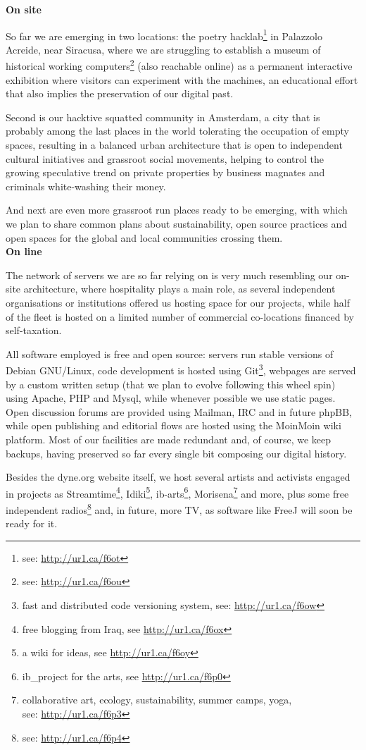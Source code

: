 \textbf{On site}

So far we are emerging in two locations: the poetry hacklab\footnote{see:
\url{http://ur1.ca/f6ot}} in Palazzolo Acreide, near Siracusa, where we are
struggling to establish a museum of historical working computers\footnote{see:
\url{http://ur1.ca/f6ou}} (also reachable online) as a permanent interactive
exhibition where visitors can experiment with the machines, an educational
ef\hbox{}fort that also implies the preservation of our digital past.

Second is our hacktive squatted community in Amsterdam, a city that is probably
among the last places in the world tolerating the occupation of empty spaces,
resulting in a balanced urban architecture that is open to independent cultural
initiatives and grassroot social movements, helping to control the growing
speculative trend on private properties by business magnates and criminals
white-washing their money.

And next are even more grassroot run places ready to be emerging, with which we
plan to share common plans about sustainability, open source practices and open
spaces for the global and local communities crossing them.\\

\textbf{On line}

The network of servers we are so far relying on is very much resembling our
on-site architecture, where hospitality plays a main role, as several
independent organisations or institutions of\hbox{}fered us hosting space for
our projects, while half of the f\hbox{}leet is hosted on a limited number of
commercial co-locations f\hbox{}inanced by self-taxation.

All software employed is free and open source: servers run stable versions of
Debian GNU/Linux, code development is hosted using Git\footnote{fast and
distributed code versioning system, see: \url{http://ur1.ca/f6ow}}, webpages are
served by a custom written setup (that we plan to evolve following this wheel
spin) using Apache, PHP and Mysql, while whenever possible we use static pages.
Open discussion forums are provided using Mailman, IRC and in future phpBB,
while open publishing and editorial f\hbox{}lows are hosted using the MoinMoin
wiki platform. Most of our facilities are made redundant and, of course, we keep
backups, having preserved so far every single bit composing our digital history.

Besides the dyne.org website itself, we host several artists and activists
engaged in projects as Streamtime\footnote{free blogging from Iraq, see
\url{http://ur1.ca/f6ox}}, Idiki\footnote{a wiki for ideas, see
\url{http://ur1.ca/f6oy}}, ib-arts\footnote{ib\_project for the arts, see
\url{http://ur1.ca/f6p0}}, Morisena\footnote{collaborative art, ecology,
sustainability, summer camps, yoga,\\see: \url{http://ur1.ca/f6p3}} and more,
plus some free independent radios\footnote{see: \url{http://ur1.ca/f6p4}} and,
in future, more TV, as software like FreeJ will soon be ready for it.


